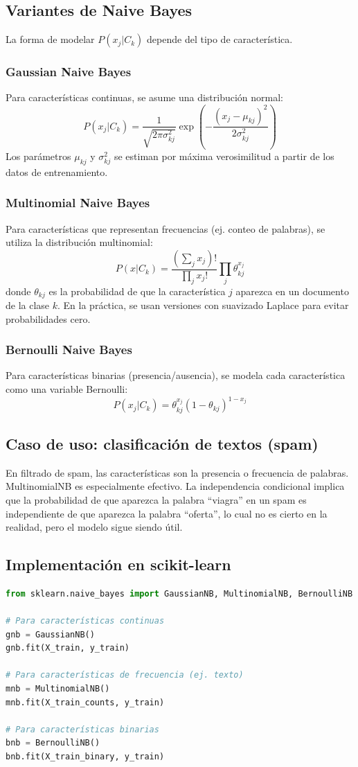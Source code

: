 \documentclass[12pt,a4paper,openany,oneside]{book}
\begin{document}
\subsection{Variantes de Naive Bayes}
La forma de modelar \(P(x_j | C_k)\) depende del tipo de característica.

\subsubsection{Gaussian Naive Bayes}
Para características continuas, se asume una distribución normal:
\[
P(x_j | C_k) = \frac{1}{\sqrt{2\pi\sigma_{kj}^2}} \exp\left( -\frac{(x_j - \mu_{kj})^2}{2\sigma_{kj}^2} \right)
\]
Los parámetros \(\mu_{kj}\) y \(\sigma_{kj}^2\) se estiman por máxima verosimilitud a partir de los datos de entrenamiento.

\subsubsection{Multinomial Naive Bayes}
Para características que representan frecuencias (ej. conteo de palabras), se utiliza la distribución multinomial:
\[
P(x | C_k) = \frac{(\sum_j x_j)!}{\prod_j x_j!} \prod_j \theta_{kj}^{x_j}
\]
donde \(\theta_{kj}\) es la probabilidad de que la característica \(j\) aparezca en un documento de la clase \(k\). En la práctica, se usan versiones con suavizado Laplace para evitar probabilidades cero.

\subsubsection{Bernoulli Naive Bayes}
Para características binarias (presencia/ausencia), se modela cada característica como una variable Bernoulli:
\[
P(x_j | C_k) = \theta_{kj}^{x_j} (1 - \theta_{kj})^{1-x_j}
\]

\subsection{Caso de uso: clasificación de textos (spam)}
En filtrado de spam, las características son la presencia o frecuencia de palabras. MultinomialNB es especialmente efectivo. La independencia condicional implica que la probabilidad de que aparezca la palabra ``viagra'' en un spam es independiente de que aparezca la palabra ``oferta'', lo cual no es cierto en la realidad, pero el modelo sigue siendo útil.

\subsection{Implementación en scikit-learn}
\begin{lstlisting}[language=Python]
from sklearn.naive_bayes import GaussianNB, MultinomialNB, BernoulliNB

# Para características continuas
gnb = GaussianNB()
gnb.fit(X_train, y_train)

# Para características de frecuencia (ej. texto)
mnb = MultinomialNB()
mnb.fit(X_train_counts, y_train)

# Para características binarias
bnb = BernoulliNB()
bnb.fit(X_train_binary, y_train)
\end{lstlisting}
\end{document}
